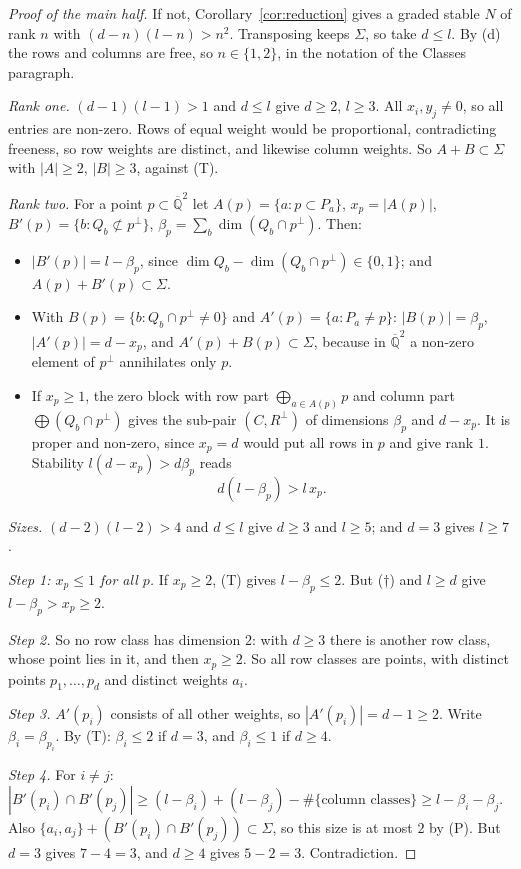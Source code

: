 \documentclass[11pt,a4paper]{article}
\theoremstyle{plain}
\theoremstyle{definition}
\newcommand{\Qbar}{\overline{\mathbb{Q}}}
\begin{document}
\begin{proof}[Proof of the main half]
If not, Corollary~\ref{cor:reduction} gives a graded stable $N$ of rank $n$ with $(d-n)(l-n)>n^{2}$. Transposing keeps $\Sigma$, so take $d\le l$. By (d) the rows and columns are free, so $n\in\{1,2\}$, in the notation of the Classes paragraph.

\emph{Rank one.} $(d-1)(l-1)>1$ and $d\le l$ give $d\ge2$, $l\ge3$. All $x_{i},y_{j}\neq0$, so all entries are non-zero. Rows of equal weight would be proportional, contradicting freeness, so row weights are distinct, and likewise column
weights. So $A+B\subset\Sigma$ with $|A|\ge2$, $|B|\ge3$, against (T).

\emph{Rank two.} For a point $p\subset\Qbar^{2}$ let $A(p)=\{a:p\subset P_{a}\}$, $x_{p}=|A(p)|$, $B'(p)=\{b:Q_{b}\not\subset p^{\perp}\}$, $\beta_{p}=\sum_{b}\dim(Q_{b}\cap p^{\perp})$. Then:
\begin{itemize}
\item $|B'(p)|=l-\beta_{p}$, since $\dim Q_{b}-\dim(Q_{b}\cap p^{\perp})\in\{0,1\}$; and $A(p)+B'(p)\subset\Sigma$.
\item With $B(p)=\{b:Q_{b}\cap p^{\perp}\neq0\}$ and $A'(p)=\{a:P_{a}\neq p\}$: $|B(p)|=\beta_{p}$, $|A'(p)|=d-x_{p}$, and $A'(p)+B(p)\subset\Sigma$, because in $\Qbar^{2}$ a non-zero element of $p^{\perp}$ annihilates only $p$.
\item If $x_{p}\ge1$, the zero block with row part $\bigoplus_{a\in A(p)}p$ and column part $\bigoplus(Q_{b}\cap p^{\perp})$ gives the sub-pair $(C,R^{\perp})$ of dimensions $\beta_{p}$ and $d-x_{p}$. It is proper and non-zero, since $x_{p}=d$ would put all rows
in $p$ and give rank $1$. Stability $l(d-x_{p})>d\beta_{p}$ reads
\begin{equation}\label{eq:dagger}
d(l-\beta_{p})>l\,x_{p}. \tag{$\dagger$}
\end{equation}
\end{itemize}

\emph{Sizes.} $(d-2)(l-2)>4$ and $d\le l$ give $d\ge3$ and $l\ge5$; and $d=3$ gives $l\ge7$.

\emph{Step 1: $x_{p}\le1$ for all $p$.} If $x_{p}\ge2$, (T) gives $l-\beta_{p}\le2$. But ($\dagger$) and $l\ge d$ give $l-\beta_{p}>x_{p}\ge2$.

\emph{Step 2.} So no row class has dimension $2$: with $d\ge3$ there is another row class, whose point lies in it, and then $x_{p}\ge2$. So all row classes are points, with distinct points $p_{1},\dots,p_{d}$ and distinct weights $a_{i}$.

\emph{Step 3.} $A'(p_{i})$ consists of all other weights, so $|A'(p_{i})|=d-1\ge2$. Write $\beta_{i}=\beta_{p_{i}}$. By (T): $\beta_{i}\le2$ if $d=3$, and $\beta_{i}\le1$ if $d\ge4$.

\emph{Step 4.} For $i\neq j$: $|B'(p_{i})\cap B'(p_{j})|\ge(l-\beta_{i})+(l-\beta_{j})-\#\{\text{column classes}\}\ge l-\beta_{i}-\beta_{j}$. Also $\{a_{i},a_{j}\}+(B'(p_{i})\cap B'(p_{j}))\subset\Sigma$, so this size is at most $2$ by (P). But $d=3$ gives $7-4=3$, and $d\ge4$ gives $5-2=3$. Contradiction.
\end{proof}
\end{document}
